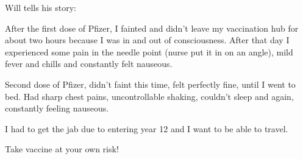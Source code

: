 Will tells his story:

After the first dose of Pfizer, I fainted and didn’t leave my vaccination hub
for about two hours because I was in and out of consciousness. After that day I
experienced some pain in the needle point (nurse put it in on an angle), mild
fever and chills and constantly felt nauseous.

Second dose of Pfizer, didn’t faint this time, felt perfectly fine, until I went
to bed. Had sharp chest pains, uncontrollable shaking, couldn’t sleep and again,
constantly feeling nauseous.

I had to get the jab due to entering year 12 and I want to be able to travel.

Take vaccine at your own risk!
